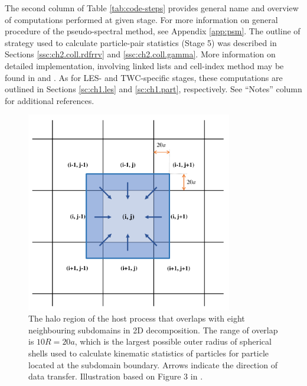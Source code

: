 \documentclass{pracamgren}
\begin{document}
The second column of Table \ref{tab:code-steps} provides general name and overview of computations performed at given stage.
For more information on general procedure of the pseudo-spectral method, see Appendix \ref{app:psm}.
The outline of strategy used to calculate particle-pair statistics (Stage 5) was described in Sections \ref{ssc:ch2.coll.rdfrrv} and \ref{ssc:ch2.coll.gamma}.
More information on detailed implementation, involving linked lists and cell-index method may be found in \textcite{Allen1987} and \textcite{Onishi2013}.
As for LES- and TWC-specific stages, these computations are outlined in Sections \ref{sc:ch1.les} and \ref{sc:ch1.part}, respectively.
See ``Notes'' column for additional references.

\begin{figure}[ht]
\centering
\includegraphics[width=9cm]{figures/3-01_halo.pdf}
\caption{
The halo region of the host process that overlaps with eight neighbouring subdomains in 2D decomposition.
The range of overlap is $10R = 20a$, which is the largest possible outer radius of spherical shells used to calculate kinematic statistics of particles for particle located at the subdomain boundary.
Arrows indicate the direction of data transfer.
Illustration based on Figure 3 in \textcite{Ayala2014}. 
}
\label{fig:halo}
\end{figure}
\end{document}

